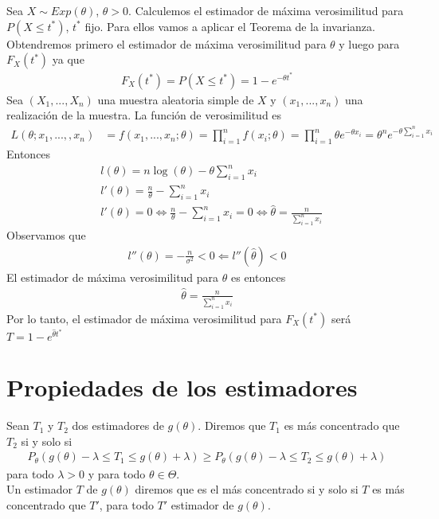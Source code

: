\begin{ejemplo}
Sea $X \sim Exp(\theta)$, $\theta > 0$. Calculemos el estimador de máxima verosimilitud para $P(X \leq t^*)$, $t^*$ fijo. Para ellos vamos a aplicar el Teorema de la invarianza. Obtendremos primero el estimador de máxima verosimilitud para $\theta$ y luego para $F_X(t^*)$ ya que
\begin{align*}
    F_X(t^*) = P(X \leq t^*) = 1 - e^{-\theta t^*}
\end{align*}
Sea $(X_1,...,X_n)$ una muestra aleatoria simple de $X$ y $(x_1,...,x_n)$ una realización de la muestra. La función de verosimilitud es
\begin{align*}
    L(\theta;x_1,...,,x_n) &= f(x_1,...,x_n;\theta) = \prod_{i=1}^{n}{f(x_i;\theta)} = \prod_{i=1}^{n}{\theta e^{-\theta x_i}} 
    = \theta^n e^{-\theta \sum_{i=1}^{n}{x_i}}
\end{align*}
Entonces
\begin{align*}
    &l(\theta) = n\log(\theta) - \theta \sum_{i=1}^{n}{x_i} \\
    &l'(\theta) = \frac{n}{\theta} - \sum_{i=1}^{n}{x_i} \\
    &l'(\theta) = 0 \Longleftrightarrow \frac{n}{\theta} - \sum_{i=1}^{n}{x_i} = 0 \Longleftrightarrow \hat{\theta} = \frac{n}{\sum_{i=1}^{n}{x_i}}
\end{align*}
Observamos que
\begin{align*}
    l''(\theta) = - \frac{n}{\sigma^2} < 0 \Longleftarrow l''(\hat{\theta}) < 0
\end{align*}
El estimador de máxima verosimilitud para $\theta$ es entonces
\begin{align*}
    \hat{\theta} = \frac{n}{\sum_{i=1}^{n}{x_i}}
\end{align*}
Por lo tanto, el estimador de máxima verosimilitud para $F_X(t^*)$ será $T = 1 - e^{\hat{\theta} t^*}$
\end{ejemplo}

\section{Propiedades de los estimadores}

\begin{defi}
Sean $T_1$ y $T_2$ dos estimadores de $g(\theta)$. Diremos que $T_1$ es más concentrado que $T_2$ si y solo si
\begin{align*}
    P_{\theta}\left( g(\theta) - \lambda \leq T_1 \leq g(\theta) + \lambda \right) \ge P_{\theta}\left( g(\theta) - \lambda \leq T_2 \leq g(\theta) + \lambda \right)
\end{align*}
para todo $\lambda > 0$ y para todo $\theta \in \Theta$.
\\
\newline
Un estimador $T$ de $g(\theta)$ diremos que es el más concentrado si y solo si $T$ es más concentrado que $T'$, para todo $T'$ estimador de $g(\theta)$.
\end{defi}

